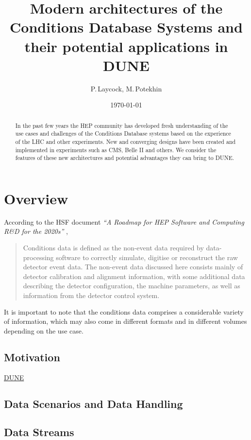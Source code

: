 \documentclass[pdftex,12pt,letter]{article}
\title{Modern architectures of the Conditions Database Systems and their potential applications in DUNE}
\date{\today}
\author{P.\,Laycock, M.\,Potekhin}
\begin{document}
\maketitle

\begin{abstract}
\noindent  In the past few years the HEP community has developed fresh understanding of
the use cases and challenges of the Conditions Database systems based on the experience of
the LHC and other experiments. New and converging designs have been created and implemented
in experiments such as CMS, Belle II and others. We consider the features of these
new architectures and potential advantages they can bring to DUNE.

\end{abstract}


\section{Overview}
According to  the HSF document \textit{``A Roadmap for HEP Software and Computing R\&D for the 2020s''} \cite{hsf_roadmap},
\begin{quote}
Conditions data is defined as the non-event data required by data-processing software to correctly simulate, digitise or reconstruct the raw detector event data. The
non-event data discussed here consists mainly of detector calibration and alignment
information, with some additional data describing the detector configuration, the
machine parameters, as well as information from the detector control system.
\end{quote}

\noindent It is important to note that the conditions data comprises a considerable variety of information,
which may also come in different formats and in different volumes depending on the use case.


\subsection{Motivation}
\underline{DUNE}

\subsection{Data Scenarios and Data Handling}
\label{sec:rawdata}

\subsection{Data Streams}
\label{sec:streams}
\end{document}
